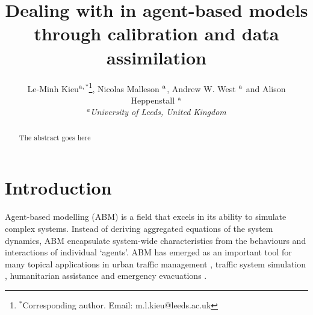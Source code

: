 \documentclass[11pt]{article}
\title{Dealing with \DIFdelbegin \DIFdel{stochasticity and dynamicity }\DIFdelend \DIFaddbegin \DIFadd{stochastic and dynamic features }\DIFaddend in agent-based models through calibration and data assimilation}
\providecommand{\DIFdelbegin}{} %
\providecommand{\DIFdelend}{} %
\newcommand{\DIFscaledelfig}{0.5}
\newlength{\DIFdelgraphicswidth} %
\newlength{\DIFdelgraphicsheight} %
\newcommand{\DIFdelincludegraphics}[2][]{%
\sbox{\DIFdelgraphicsbox}{\DIFOincludegraphics[#1]{#2}}%
\settoboxwidth{\DIFdelgraphicswidth}{\DIFdelgraphicsbox} %
\settoboxtotalheight{\DIFdelgraphicsheight}{\DIFdelgraphicsbox} %
\scalebox{\DIFscaledelfig}{%
\parbox[b]{\DIFdelgraphicswidth}{\usebox{\DIFdelgraphicsbox}\\[-\baselineskip] \rule{\DIFdelgraphicswidth}{0em}}\llap{\resizebox{\DIFdelgraphicswidth}{\DIFdelgraphicsheight}{%
\setlength{\unitlength}{\DIFdelgraphicswidth}%
\begin{picture}(1,1)%
\thicklines\linethickness{2pt} %
{\color[rgb]{1,0,0}\put(0,0){\framebox(1,1){}}}%
{\color[rgb]{1,0,0}\put(0,0){\line( 1,1){1}}}%
{\color[rgb]{1,0,0}\put(0,1){\line(1,-1){1}}}%
\end{picture}%
}\hspace*{3pt}}} %
} %
\DeclareRobustCommand{\DIFdelbegin}{\DIFOdelbegin \let\includegraphics\DIFdelincludegraphics} %
\DeclareRobustCommand{\DIFdelend}{\DIFOaddend \let\includegraphics\DIFOincludegraphics} %
\begin{document}
\author{Le-Minh Kieu$^{\rm a,}$$^{\ast}$\thanks{$^\ast$Corresponding author. Email: m.l.kieu@leeds.ac.uk \vspace{6pt}},  Nicolas Malleson $^{\rm a}$, Andrew W. West $^{\rm a}$ and  
Alison Heppenstall $^{\rm a}$
\\\vspace{6pt}  $^{a}${\em{University of Leeds, United Kingdom}}}

\maketitle 

\begin{abstract}
The abstract goes here
\end{abstract}

\section{Introduction}
\label{s:Intro}

\DIFdelbegin %

\DIFdelend Agent-based modelling (ABM) \citep{epstein_growing_1996, macal_tutorial_2005} is a field that excels in its ability to simulate complex systems. Instead of deriving aggregated equations of the system dynamics, ABM encapsulate system-wide characteristics from the behaviours and interactions of individual ‘agents’. ABM has emerged as an important tool for many topical applications in urban traffic management \citep{li2011cloud}, traffic system simulation \citep{balmer2009matsim}, humanitarian assistance \citep{crooks_gis_2013} and emergency evacuations \citep{ren_agentbased_2009, schoenharl_design_2011}. 
\end{document}
